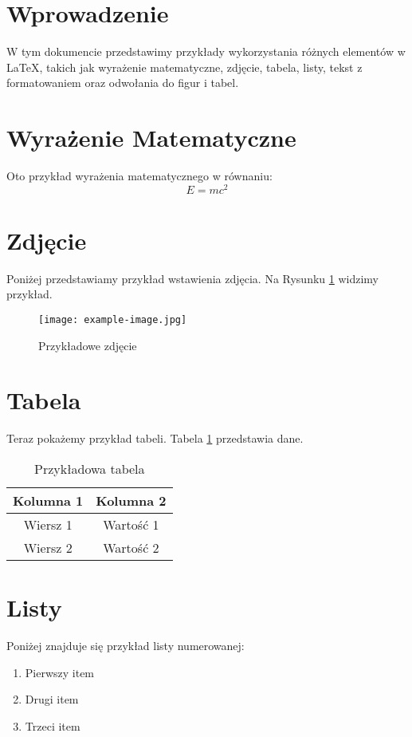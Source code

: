 \documentclass{article}
\begin{document}
\section{Wprowadzenie}
W tym dokumencie przedstawimy przykłady wykorzystania różnych elementów w LaTeX, takich jak wyrażenie matematyczne, zdjęcie, tabela, listy, tekst z formatowaniem oraz odwołania do figur i tabel.

\section{Wyrażenie Matematyczne}
Oto przykład wyrażenia matematycznego w równaniu:
\[
E=mc^2
\]

\section{Zdjęcie}
Poniżej przedstawiamy przykład wstawienia zdjęcia. Na Rysunku \ref{fig:example} widzimy przykład.

\begin{figure}[h]
    \centering
    \texttt{[image: example-image.jpg]}
    \caption{Przykładowe zdjęcie}
    \label{fig:example}
\end{figure}

\section{Tabela}
Teraz pokażemy przykład tabeli. Tabela \ref{tab:example} przedstawia dane.

\begin{table}[h]
    \centering
    \begin{tabular}{|c|c|}
        \hline
        Kolumna 1 & Kolumna 2 \\
        \hline
        Wiersz 1 & Wartość 1 \\
        Wiersz 2 & Wartość 2 \\
        \hline
    \end{tabular}
    \caption{Przykładowa tabela}
    \label{tab:example}
\end{table}

\section{Listy}
Poniżej znajduje się przykład listy numerowanej:
\begin{enumerate}
    \item Pierwszy item
    \item Drugi item
    \item Trzeci item
\end{enumerate}
\end{document}
